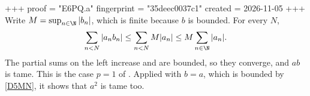 +++
proof = "E6PQ.a"
fingerprint = "35deec0037c1"
created = 2026-11-05
+++
Write $M = \sup_{n \in \N} |b_n|$, which is finite because $b$ is bounded. For every $N$,
\[
  \sum_{n < N} |a_n b_n| \le \sum_{n < N} M |a_n| \le M \sum_{n \in \N} |a_n|.
\]
The partial sums on the left increase and are bounded, so they converge, and $ab$ is tame. This is the case $p = 1$ of . Applied with $b = a$, which is bounded by \ref{D5MN}, it shows that $a^2$ is tame too.
